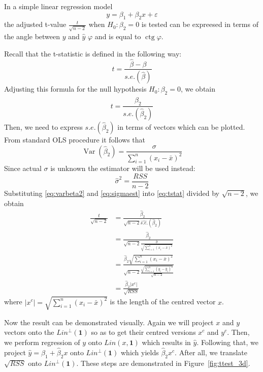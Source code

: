 \documentclass[nobib]{tufte-handout}
\DeclareMathOperator{\Var}{Var}
\DeclareMathOperator{\ctg}{ctg}
\theoremstyle{definition}
\begin{document}
In a simple linear regression model
\[
y = \beta_1 + \beta_2 x + \varepsilon
\]
the adjusted t-value $\frac{t}{\sqrt{n-2}}$ when $H_0: \beta_2 = 0$ is tested
can be expreesed in terms of the angle between $y$ and $\hat y$ $\varphi$ and
is equal to $\ctg \varphi$.

Recall that the t-statistic is defined in the following way:
\[
t = \frac{\hat \beta - \beta}{s.e.(\hat\beta)}
\]
Adjusting this formula for the null hypothesis $H_0: \beta_2 = 0$, we obtain
\begin{equation}\label{eq:tstat}
t = \frac{\hat \beta_2}{s.e.(\hat\beta_2)}
\end{equation}
Then, we need to express $s.e.(\hat\beta_2)$ in terms of vectors which can be
plotted. From standard OLS procedure it follows that
\begin{equation}\label{eq:varbeta2}
\Var(\hat \beta_2) = \frac{\sigma}{\sum_{i=1}^n (x_i - \bar x)^2}
\end{equation}
Since actual $\sigma$ is unknown the estimator will be used instead:
\begin{equation}\label{eq:sigmaest}
\hat \sigma^2 = \frac{RSS}{n-2}
\end{equation}
Substituting \eqref{eq:varbeta2} and \eqref{eq:sigmaest} into \eqref{eq:tstat}
divided by $\sqrt{n-2}$, we obtain
\begin{align*}
\frac{t}{\sqrt{n-2}} &= \frac{\hat \beta_2}{\sqrt{n-2}\widehat{s.e.}(\hat\beta_2)} \\
&= \frac{\hat \beta_2}{\sqrt{n-2}\frac{\hat \sigma}{\sqrt{\sum_{i=1}^n (x_i - \bar x)^2}}} \\
&= \frac{\hat \beta_2 \sqrt{\sum_{i=1}^n (x_i - \bar x)^2}}{\sqrt{n-2}\frac{\sqrt{\sum_{i=1}^n (y_i - \hat y_i)^2}}{\sqrt{n-2}}} \\
&= \frac{\hat \beta_2 \vert x^c \vert}{\sqrt{RSS}}
\end{align*}
where $ \vert x^c \vert = \sqrt{\sum_{i=1}^n (x_i - \bar x)^2}$ is the length of the
centred vector $x$.

Now the result can be demonstrated visually.
Again we will project $x$ and $y$ vectors onto the $Lin^{\perp}(\mathbf{1})$ so as to
get their centred versions $x^c$ and $y^c$.
Then, we perform regression of $y$ onto $Lin(x, \mathbf{1})$ which results in $\hat y$.
Following that, we project $\hat y = \hat \beta_1 + \hat \beta_2 x$ onto $Lin^{\perp}(\mathbf{1})$
which yields $\hat \beta_2 x^c$.
After all, we translate $\sqrt{RSS}$ onto $Lin^{\perp}(\mathbf{1})$.
These steps are demonstrated in Figure~\ref{fig:ttest_3d}.
\end{document}
